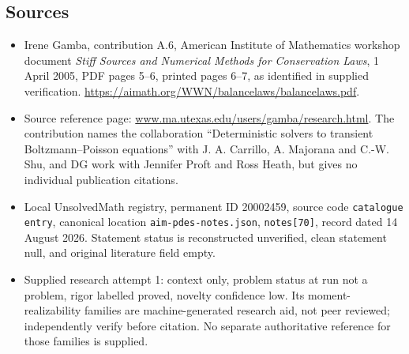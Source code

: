 \documentclass[11pt]{article}
\begin{document}
\subsection{Sources}
\begin{itemize}
\item Irene Gamba, contribution A.6, American Institute of Mathematics workshop document \emph{Stiff Sources and Numerical Methods for Conservation Laws}, 1 April 2005, PDF pages 5--6, printed pages 6--7, as identified in supplied verification. \url{https://aimath.org/WWN/balancelaws/balancelaws.pdf}.
\item Source reference page: \url{www.ma.utexas.edu/users/gamba/research.html}. The contribution names the collaboration ``Deterministic solvers to transient Boltzmann--Poisson equations'' with J. A. Carrillo, A. Majorana and C.-W. Shu, and DG work with Jennifer Proft and Ross Heath, but gives no individual publication citations.
\item Local UnsolvedMath registry, permanent ID 20002459, source code \texttt{catalogue entry}, canonical location \texttt{aim-pdes-notes.json}, \texttt{notes[70]}, record dated 14 August 2026. Statement status is reconstructed unverified, clean statement null, and original literature field empty.
\item Supplied research attempt 1: context only, problem status at run not a problem, rigor labelled proved, novelty confidence low. Its moment-realizability families are machine-generated research aid, not peer reviewed; independently verify before citation. No separate authoritative reference for those families is supplied.
\end{itemize}
\end{document}
